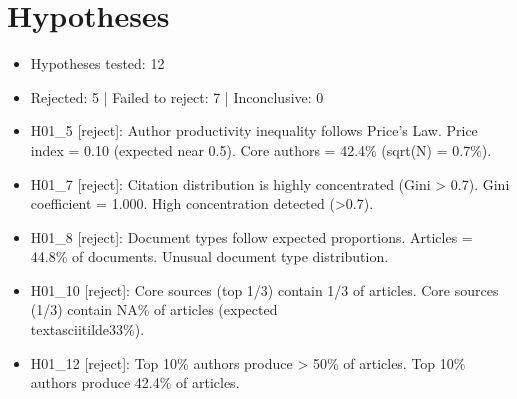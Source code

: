 \documentclass[12pt]{article}
\begin{document}
\section*{Hypotheses}
\begin{itemize}
\item Hypotheses tested: 12
\item Rejected: 5 | Failed to reject: 7 | Inconclusive: 0
\item H01\_5 [reject]: Author productivity inequality follows Price's Law. Price index = 0.10 (expected near 0.5). Core authors = 42.4\% (sqrt(N) = 0.7\%).
\item H01\_7 [reject]: Citation distribution is highly concentrated (Gini > 0.7). Gini coefficient = 1.000. High concentration detected (>0.7).
\item H01\_8 [reject]: Document types follow expected proportions. Articles = 44.8\% of documents. Unusual document type distribution.
\item H01\_10 [reject]: Core sources (top 1/3) contain 1/3 of articles. Core sources (1/3) contain NA\% of articles (expected \\textasciitilde{}33\%).
\item H01\_12 [reject]: Top 10\% authors produce > 50\% of articles. Top 10\% authors produce 42.4\% of articles.
\end{itemize}
\end{document}
